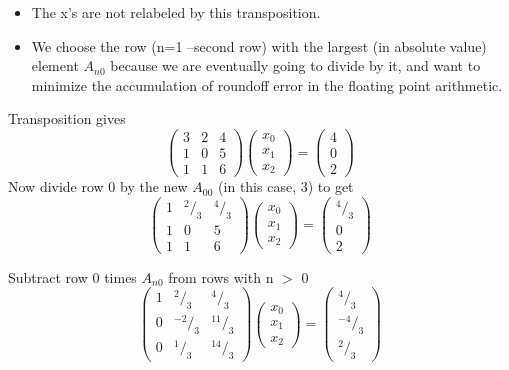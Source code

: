 \begin{itemize}
  \item The x's are not relabeled by this transposition. 
  \item We choose the row (n=1 --second row) with the largest (in
      absolute value) element $A_{n0}$ because we are eventually going
to divide by it, and want to minimize the accumulation of
roundoff error in the floating point arithmetic.  
\end{itemize}
Transposition gives
\begin{equation}
    \label{eq:09_16}
    \begin{pmatrix}
        3 &2 &4\\ 
        1 &0 &5\\ 
        1 &1 &6
    \end{pmatrix}
    \begin{pmatrix}
        x_0\\
        x_1\\
        x_2
    \end{pmatrix}
    =
    \begin{pmatrix}
        4\\
        0\\
        2
    \end{pmatrix}
\end{equation}
Now divide row 0 by the new $A_{00}$ (in this case, 3) to get
\begin{equation}
    \label{eq:09_17}
    \begin{pmatrix}
        1 &^2/_3 &^4/_3\\ 
        1 &0 &5\\ 
        1 &1 &6
    \end{pmatrix}
    \begin{pmatrix}
        x_0\\
        x_1\\
        x_2
    \end{pmatrix}
    =
    \begin{pmatrix}
        ^4/_3\\
        0\\
        2
    \end{pmatrix}
\end{equation}

Subtract row 0 times $A_{n0}$ from rows with n $>$ 0
\begin{equation}
    \label{eq:09_18}
    \begin{pmatrix}
        1 &^2/_3 &^4/_3\\ 
        0 &^{-2}/_3 &^{11}/_3\\ 
        0 &^1/_3 &^{14}/_3
    \end{pmatrix}
    \begin{pmatrix}
        x_0\\
        x_1\\
        x_2
    \end{pmatrix}
    =
    \begin{pmatrix}
        ^4/_3\\
        ^{-4}/_3\\
        ^2/_3
    \end{pmatrix}
\end{equation}

